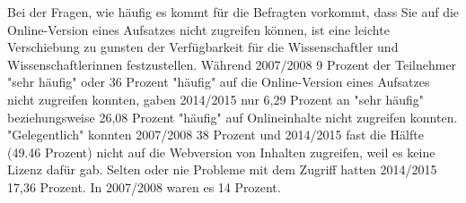 Bei der Fragen, wie häufig es kommt für die Befragten vorkommt, dass Sie auf die Online-Version eines Aufsatzes nicht zugreifen können, ist eine leichte Verschiebung zu gunsten der Verfügbarkeit für die Wissenschaftler und Wissenschaftlerinnen festzustellen. Während 2007/2008 9 Prozent der Teilnehmer "sehr häufig" oder 36 Prozent "häufig" auf die Online-Version eines Aufsatzes nicht zugreifen konnten, gaben 2014/2015 nur 6,29 Prozent an "sehr häufig" beziehungsweise 26,08 Prozent "häufig" auf Onlineinhalte nicht zugreifen konnten. "Gelegentlich" konnten 2007/2008 38 Prozent und 2014/2015 fast die Hälfte (49.46 Prozent) nicht auf die Webversion von Inhalten zugreifen, weil es keine Lizenz dafür gab. Selten oder nie Probleme mit dem Zugriff hatten 2014/2015 17,36 Prozent. In 2007/2008 waren es 14 Prozent.
